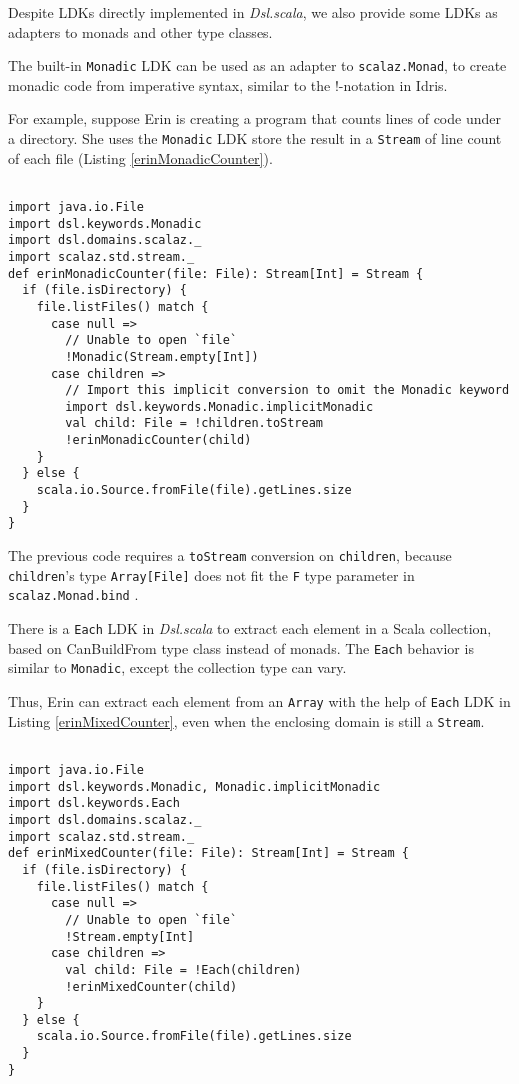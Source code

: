 Despite LDKs directly implemented in \textit{Dsl.scala}, we also provide some LDKs as adapters to monads and other type classes.

The built-in \lstinline{Monadic} LDK can be used as an adapter to \lstinline{scalaz.Monad}, to create monadic code from imperative syntax, similar to the !-notation in Idris.

For example, suppose Erin is creating a program that counts lines of code under a directory. She uses the \lstinline{Monadic} LDK store the result in a \lstinline{Stream} of line count of each file (Listing \ref{erinMonadicCounter}).

\begin{lstlisting}[caption={Erin's line of code counter, the monadic version},label={erinMonadicCounter}]

import java.io.File
import dsl.keywords.Monadic
import dsl.domains.scalaz._
import scalaz.std.stream._
def erinMonadicCounter(file: File): Stream[Int] = Stream {
  if (file.isDirectory) {
    file.listFiles() match {
      case null =>
        // Unable to open `file`
        !Monadic(Stream.empty[Int])
      case children =>
        // Import this implicit conversion to omit the Monadic keyword
        import dsl.keywords.Monadic.implicitMonadic
        val child: File = !children.toStream
        !erinMonadicCounter(child)
    }
  } else {
    scala.io.Source.fromFile(file).getLines.size
  }
}
\end{lstlisting}

The previous code requires a \lstinline{toStream} conversion on \lstinline{children}, because \lstinline{children}'s type \lstinline{Array[File]} does not fit the \lstinline{F} type parameter in \lstinline{scalaz.Monad.bind} \cite{kenji2017scalaz}.

There is a \lstinline{Each} LDK in \textit{Dsl.scala} to extract each element in a Scala collection, based on {CanBuildFrom} type class instead of monads. The \lstinline{Each} behavior is similar to \lstinline{Monadic}, except the collection type can vary.

Thus, Erin can extract each element from an \lstinline{Array} with the help of \lstinline{Each} LDK in Listing \ref{erinMixedCounter},
even when the enclosing domain is still a \lstinline{Stream}.

\begin{lstlisting}[caption={Erin's line of code counter, mixed \lstinline{Monad}-based and \lstinline{CanBuildFrom}-based LDKs},label={erinMixedCounter}]

import java.io.File
import dsl.keywords.Monadic, Monadic.implicitMonadic
import dsl.keywords.Each
import dsl.domains.scalaz._
import scalaz.std.stream._
def erinMixedCounter(file: File): Stream[Int] = Stream {
  if (file.isDirectory) {
    file.listFiles() match {
      case null =>
        // Unable to open `file`
        !Stream.empty[Int]
      case children =>
        val child: File = !Each(children)
        !erinMixedCounter(child)
    }
  } else {
    scala.io.Source.fromFile(file).getLines.size
  }
}
\end{lstlisting}

